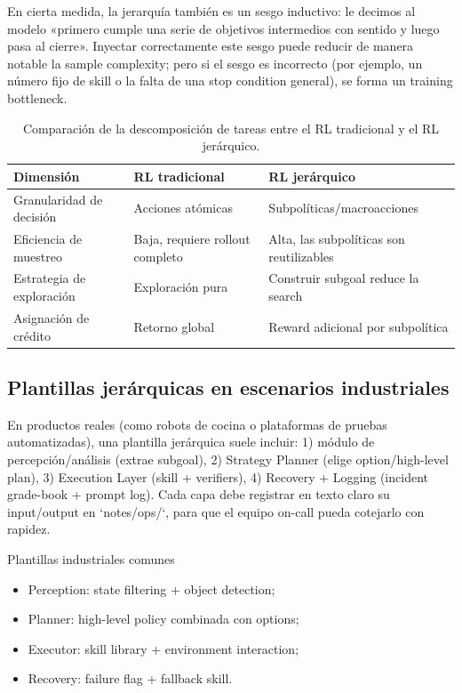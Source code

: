 En cierta medida, la jerarquía también es un sesgo inductivo: le decimos al modelo «primero cumple una serie de objetivos intermedios con sentido y luego pasa al cierre». Inyectar correctamente este sesgo puede reducir de manera notable la sample complexity; pero si el sesgo es incorrecto (por ejemplo, un número fijo de skill o la falta de una stop condition general), se forma un training bottleneck.

\begin{table}[H]
\centering
\begin{tabular}{p{4cm}p{5cm}p{3cm}}
\toprule
Dimensión & RL tradicional & RL jerárquico \\
\midrule
Granularidad de decisión & Acciones atómicas & Subpolíticas/macroacciones \\
Eficiencia de muestreo & Baja, requiere rollout completo & Alta, las subpolíticas son reutilizables \\
Estrategia de exploración & Exploración pura & Construir subgoal reduce la search \\
Asignación de crédito & Retorno global & Reward adicional por subpolítica \\
\bottomrule
\end{tabular}
\caption{Comparación de la descomposición de tareas entre el RL tradicional y el RL jerárquico.}
\end{table}

\subsection{Plantillas jerárquicas en escenarios industriales}

En productos reales (como robots de cocina o plataformas de pruebas automatizadas), una plantilla jerárquica suele incluir: 1) módulo de percepción/análisis (extrae subgoal), 2) Strategy Planner (elige option/high-level plan), 3) Execution Layer (skill + verifiers), 4) Recovery + Logging (incident grade-book + prompt log). Cada capa debe registrar en texto claro su input/output en `notes/ops/`, para que el equipo on-call pueda cotejarlo con rapidez.

\begin{knowledgebox}{Plantillas industriales comunes}
\begin{itemize}
    \item Perception: state filtering + object detection;
    \item Planner: high-level policy combinada con options;
    \item Executor: skill library + environment interaction;
    \item Recovery: failure flag + fallback skill.
\end{itemize}
\end{knowledgebox}

